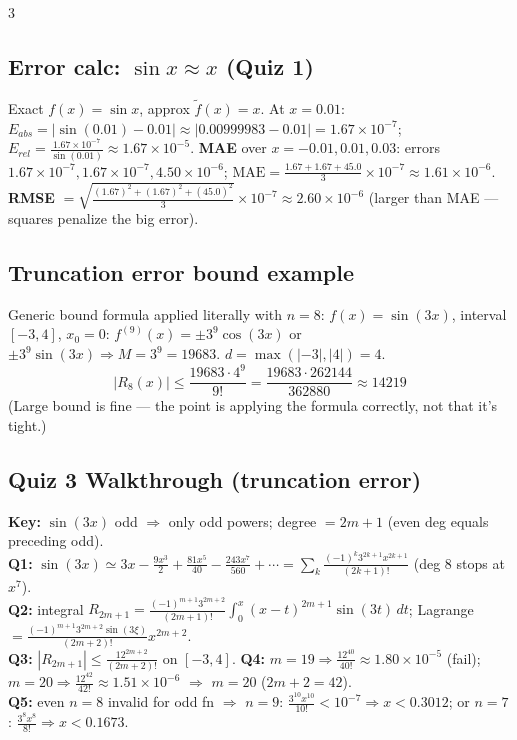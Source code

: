 \documentclass[9pt]{extarticle}
\newcommand{\hl}[1]{\textbf{\textcolor{BrickRed}{#1}}}
\begin{document}
\begin{multicols}{3}
\subsection{Error calc: $\sin x\approx x$ (Quiz 1)}
Exact $f(x)=\sin x$, approx $\tilde f(x)=x$. At $x=0.01$: $E_{abs}=|\sin(0.01)-0.01|\approx|0.00999983-0.01|=1.67\times10^{-7}$; $E_{rel}=\tfrac{1.67\times10^{-7}}{\sin(0.01)}\approx1.67\times10^{-5}$.
\textbf{MAE} over $x=-0.01,0.01,0.03$: errors $1.67\times10^{-7},1.67\times10^{-7},4.50\times10^{-6}$; $\text{MAE}=\tfrac{1.67+1.67+45.0}{3}\times10^{-7}\approx1.61\times10^{-6}$.
\textbf{RMSE} $=\sqrt{\tfrac{(1.67)^2+(1.67)^2+(45.0)^2}{3}}\times10^{-7}\approx2.60\times10^{-6}$ (larger than MAE — squares penalize the big error).

\subsection{Truncation error bound example}
Generic bound formula applied literally with $n=8$: $f(x)=\sin(3x)$, interval $[-3,4]$, $x_0=0$: $f^{(9)}(x)=\pm3^9\cos(3x)$ or $\pm3^9\sin(3x)\Rightarrow M=3^9=19683$. $d=\max(|{-3}|,|4|)=4$.
\begin{equation*}
|R_8(x)|\le\frac{19683\cdot4^9}{9!}=\frac{19683\cdot262144}{362880}\approx14219
\end{equation*}
(Large bound is fine — the point is applying the formula correctly, not that it's tight.)

\subsection{Quiz 3 Walkthrough (truncation error)}
\begin{sloppypar}\raggedright
\hl{Key:} $\sin(3x)$ odd $\Rightarrow$ only odd powers; degree $=2m{+}1$ (even deg equals preceding odd).\\
\hl{Q1:} $\sin(3x)\simeq3x-\tfrac{9x^3}{2}+\tfrac{81x^5}{40}-\tfrac{243x^7}{560}+\cdots=\sum_{k}\tfrac{(-1)^k3^{2k+1}x^{2k+1}}{(2k+1)!}$ (deg 8 stops at $x^7$).\\
\hl{Q2:} integral $R_{2m+1}=\tfrac{(-1)^{m+1}3^{2m+2}}{(2m+1)!}\int_0^x(x-t)^{2m+1}\sin(3t)\,dt$; Lagrange $=\tfrac{(-1)^{m+1}3^{2m+2}\sin(3\xi)}{(2m+2)!}x^{2m+2}$.\\
\hl{Q3:} $|R_{2m+1}|\le\tfrac{12^{2m+2}}{(2m+2)!}$ on $[-3,4]$. \hl{Q4:} $m{=}19\Rightarrow\tfrac{12^{40}}{40!}\approx1.80\times10^{-5}$ (fail); $m{=}20\Rightarrow\tfrac{12^{42}}{42!}\approx1.51\times10^{-6}$ $\Rightarrow$ \hl{$m=20$} ($2m{+}2{=}42$).\\
\hl{Q5:} even $n{=}8$ invalid for odd fn $\Rightarrow$ $n{=}9$: $\tfrac{3^{10}x^{10}}{10!}<10^{-7}\Rightarrow x<0.3012$; or $n{=}7$: $\tfrac{3^8x^8}{8!}\Rightarrow x<0.1673$.
\end{sloppypar}


\end{multicols}
\end{document}
